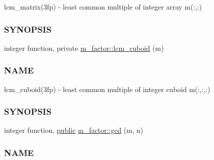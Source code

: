 \begin{DoxyCompactItemize}
\begin{DoxyCompactList}
lcm\+\_\+matrix(3fp) -\/ least common multiple of integer array m(\+:,\+:) \subsubsection*{S\+Y\+N\+O\+P\+S\+IS}\end{DoxyCompactList}\item 
integer function, private \hyperlink{namespacem__factor_ae9aed0802e2c5a923b255f143ddf6e15}{m\+\_\+factor\+::lcm\+\_\+cuboid} (m)
\begin{DoxyCompactList}\small\item\em \subsubsection*{N\+A\+ME}

lcm\+\_\+cuboid(3fp) -\/ least common multiple of integer cuboid m(\+:,\+:,\+:) \subsubsection*{S\+Y\+N\+O\+P\+S\+IS}\end{DoxyCompactList}\item 
integer function, \hyperlink{M__stopwatch_83_8txt_a2f74811300c361e53b430611a7d1769f}{public} \hyperlink{namespacem__factor_a69e8c33eff58fc447cfb8d4f3d4fae77}{m\+\_\+factor\+::gcd} (m, n)
\begin{DoxyCompactList}\small\item\em \subsubsection*{N\+A\+ME}


\end{DoxyCompactList}
\end{DoxyCompactItemize}
